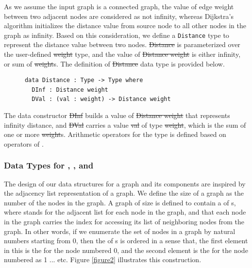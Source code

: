 As we assume the input graph is a connected graph, the value of edge weight between two adjacent nodes are considered as not infinity, whereas Dijkstra's algorithm initializes the distance value from source node to all other nodes in the graph as infinity. Based on this consideration, we define a \texttt{Distance} type to represent the distance value between two nodes. \st{Distance} is parameterized over the user-defined \st{weight} type, and the value of \st{Distance weight} is either infinity, or sum of \st{weight}s. The definition of \st{Distance} data type is provided below. 
\begin{lstlisting}
      data Distance : Type -> Type where
        DInf : Distance weight
        DVal : (val : weight) -> Distance weight
\end{lstlisting}

The data constructor \st{DInf} builds a value of \st{Distance weight} that represents infinity distance, and \st{DVal} carries a value \st{val} of type \st{weight}, which is the sum of one or more \st{weight}s. Arithmetic operators for the  type is defined based on operators of .
\\

\subsubsection{Data Types for , , and } \label{graph}
The design of our data structures for a graph and its components are inspired by the adjacency list representation of a graph. We define the size of a graph as the number of the nodes in the graph. A graph of size  is defined to contain a  of  s, where  stands for the adjacent list for each node in the graph, and that each node in the graph carries the index for accessing its list of neighboring nodes from the graph. In other words, if we enumerate the set of nodes in a graph by natural numbers starting from 0, then the  of s is ordered in a sense that, the first element in this  is the  for the node numbered 0, and the second element is the  for the node numbered as 1 ... etc. Figure \ref{figure2} illustrates this construction. 

